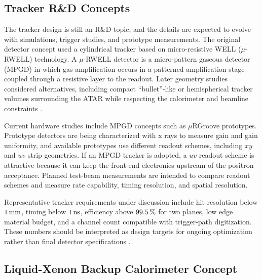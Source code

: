 \subsection{Tracker R\&D Concepts}
\label{sec:appendix-tracker-rd}

The tracker design is still an R\&D topic, and the details are expected to
evolve with simulations, trigger studies, and prototype measurements. The
original detector concept used a cylindrical tracker based on micro-resistive
WELL (\(\mu\)-RWELL) technology. A \(\mu\)-RWELL detector is a
micro-pattern gaseous detector (MPGD) in which gas amplification occurs in a
patterned amplification stage coupled through a resistive layer to the
readout. Later geometry studies considered alternatives, including compact
``bullet''-like or hemispherical tracker volumes surrounding the ATAR while
respecting the calorimeter and beamline constraints
\cite{pioneer_tracker_geometries,tracker_toward_pioneer_2025}.

Current hardware studies include MPGD concepts such as \(\mu\)RGroove
prototypes. Prototype detectors are being characterized with x rays to measure
gain and gain uniformity, and available prototypes use different readout
schemes, including \(xy\) and \(uv\) strip geometries. If an MPGD tracker is
adopted, a \(uv\) readout scheme is attractive because it can keep the
front-end electronics upstream of the positron acceptance. Planned test-beam
measurements are intended to compare readout schemes and measure rate
capability, timing resolution, and spatial resolution.

Representative tracker requirements under discussion include hit resolution
below \(\withunit{1}{\milli\meter}\), timing below
\(\SI{1}{\nano\second}\), efficiency above
\(\SI{99.5}{\percent}\) for two planes, low edge material budget, and a
channel count compatible with trigger-path digitization. These numbers should
be interpreted as design targets for ongoing optimization rather than final
detector specifications \cite{atar_kpp_2025,tracker_toward_pioneer_2025}.
\FloatBarrier

\subsection{Liquid-Xenon Backup Calorimeter Concept}
\label{sec:appendix-lxe-calorimeter}

